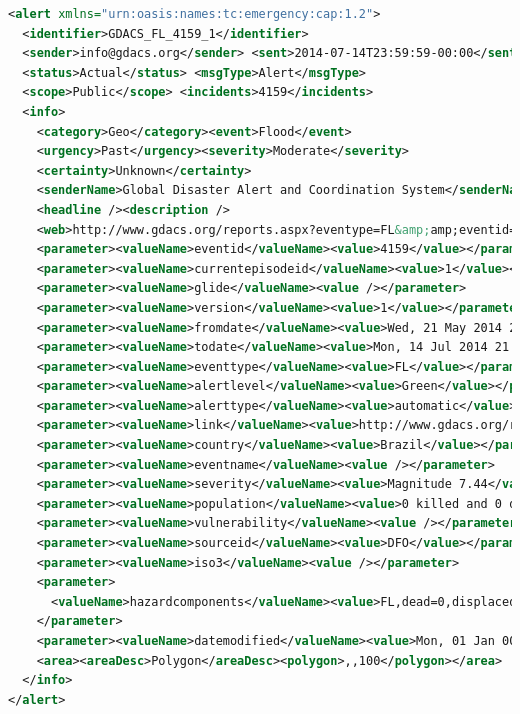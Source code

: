 \documentclass[letterpaper]{article}
\begin{document}
\begin{lstlisting}[caption={\emph{Common Alerting Protocol} feed
  via the \emph{Global Disaster Alert and Coordination System}
  (\url{http://www.gdacs.org/xml/gdacs_cap.xml}, 2014-07-16)},
  label=listing:cap, language=xml,morekeywords={xmlns,encoding,alert,
  identifier,sender,sent,status,msgType,scope,incidents,info,
  category,event,urgency,severity,certainty, senderName,headline,
  description,web,parameter,value,valueName,area,areaDesc,polygon},
  float=*, stringstyle=\color{gray}, ]
<alert xmlns="urn:oasis:names:tc:emergency:cap:1.2">
  <identifier>GDACS_FL_4159_1</identifier>
  <sender>info@gdacs.org</sender> <sent>2014-07-14T23:59:59-00:00</sent>
  <status>Actual</status> <msgType>Alert</msgType>
  <scope>Public</scope> <incidents>4159</incidents>
  <info>
    <category>Geo</category><event>Flood</event>
    <urgency>Past</urgency><severity>Moderate</severity>
    <certainty>Unknown</certainty>
    <senderName>Global Disaster Alert and Coordination System</senderName>
    <headline /><description />
    <web>http://www.gdacs.org/reports.aspx?eventype=FL&amp;amp;eventid=4159</web>
    <parameter><valueName>eventid</valueName><value>4159</value></parameter>
    <parameter><valueName>currentepisodeid</valueName><value>1</value></parameter>
    <parameter><valueName>glide</valueName><value /></parameter>
    <parameter><valueName>version</valueName><value>1</value></parameter>
    <parameter><valueName>fromdate</valueName><value>Wed, 21 May 2014 22:00:00 GMT</value></parameter>
    <parameter><valueName>todate</valueName><value>Mon, 14 Jul 2014 21:59:59 GMT</value></parameter>
    <parameter><valueName>eventtype</valueName><value>FL</value></parameter>
    <parameter><valueName>alertlevel</valueName><value>Green</value></parameter>
    <parameter><valueName>alerttype</valueName><value>automatic</value></parameter>
    <parameter><valueName>link</valueName><value>http://www.gdacs.org/report.aspx?eventtype=FL&amp;amp;eventid=4159</value></parameter>
    <parameter><valueName>country</valueName><value>Brazil</value></parameter>
    <parameter><valueName>eventname</valueName><value /></parameter>
    <parameter><valueName>severity</valueName><value>Magnitude 7.44</value></parameter>
    <parameter><valueName>population</valueName><value>0 killed and 0 displaced</value></parameter>
    <parameter><valueName>vulnerability</valueName><value /></parameter>
    <parameter><valueName>sourceid</valueName><value>DFO</value></parameter>
    <parameter><valueName>iso3</valueName><value /></parameter>
    <parameter>
      <valueName>hazardcomponents</valueName><value>FL,dead=0,displaced=0,main_cause=Heavy Rain,severity=2,sqkm=256564.57</value>
    </parameter>
    <parameter><valueName>datemodified</valueName><value>Mon, 01 Jan 0001 00:00:00 GMT</value></parameter>
    <area><areaDesc>Polygon</areaDesc><polygon>,,100</polygon></area>
  </info>
</alert>
\end{lstlisting}
\end{document}
